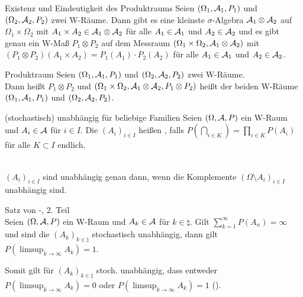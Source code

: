 \begin{Satz}{Existenz und Eindeutigkeit des Produktraums}
    Seien $(\Omega_1, \mathcal{A}_1, P_1)$ und $(\Omega_2, \mathcal{A}_2, P_2)$ zwei W-Räume.
    Dann gibt es eine kleinste $\sigma$-Algebra $\mathcal{A}_1 \otimes \mathcal{A}_2$ auf $\Omega_1 \times \Omega_2$
    mit $A_1 \times A_2 \in \mathcal{A}_1 \otimes \mathcal{A}_2$ für alle $A_1 \in \mathcal{A}_1$ und $A_2 \in \mathcal{A}_2$
    und es gibt genau ein W-Maß $P_1 \otimes P_2$ auf dem Messraum
    $(\Omega_1 \times \Omega_2, \mathcal{A}_1 \otimes \mathcal{A}_2)$ mit
    $(P_1 \otimes P_2)(A_1 \times A_2) = P_1(A_1) \cdot P_2(A_2)$
    für alle $A_1 \in \mathcal{A}_1$ und $A_2 \in \mathcal{A}_2$.
\end{Satz}

\begin{Def}{Produktraum}
    Seien $(\Omega_1, \mathcal{A}_1, P_1)$ und $(\Omega_2, \mathcal{A}_2, P_2)$ zwei W-Räume.\\
    Dann heißt $P_1 \otimes P_2$  und
    $(\Omega_1 \times \Omega_2, \mathcal{A}_1 \otimes \mathcal{A}_2, P_1 \otimes P_2)$ heißt 
    der beiden W-Räume $(\Omega_1, \mathcal{A}_1, P_1)$ und $(\Omega_2, \mathcal{A}_2, P_2)$.
\end{Def}

\linie

\begin{Def}{(stochastisch) unabhängig für beliebige Familien}
    Seien $(\Omega, \mathcal{A}, P)$ ein W-Raum und $A_i \in \mathcal{A}$ für $i \in I$.
    Die $(A_i)_{i \in I}$ heißen ,
    falls $P(\bigcap_{i \in K}) = \prod_{i \in K} P(A_i)$
    für alle $K \subset I$ endlich.
\end{Def}

\begin{Bem}\\
    $(A_i)_{i \in I}$ sind unabhängig genau dann, wenn die Komplemente
    $(\Omega \setminus A_i)_{i \in I}$ unabhängig sind.
\end{Bem}

\begin{Satz}{Satz von -, 2. Teil}\\
    Seien $(\Omega, \mathcal{A}, P)$ ein W-Raum und $A_k \in \mathcal{A}$ für $k \in \natural$.
    Gilt $\sum_{k=1}^\infty P(A_n) = \infty$ und sind die $(A_k)_{k \in \natural}$ stochastisch
    unabhängig, dann gilt $P(\limsup_{k \to \infty} A_k) = 1$.
\end{Satz}

\begin{Bem}
    Somit gilt für $(A_k)_{k \in \natural}$ stoch. unabhängig,
    dass entweder $P(\limsup_{k \to \infty} A_k) = 0$ oder $P(\limsup_{k \to \infty} A_k) = 1$
    ().
\end{Bem}

